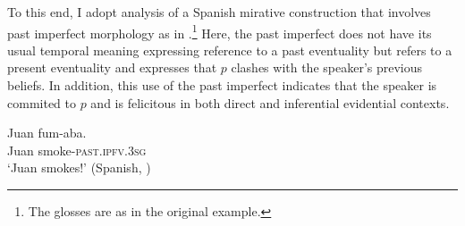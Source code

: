 \documentclass[output=paper,
colorlinks,
citecolor=brown,
newtxmath
]{langscibook}
\begin{document}
%
%
%

To this end, I adopt  analysis of a Spanish mirative construction that involves past imperfect morphology as in .\footnote{The glosses are as in the original example.} Here, the past imperfect does not have its usual temporal meaning expressing reference to a past eventuality but refers to a present eventuality and expresses that $p$ clashes with the speaker's previous beliefs. In addition, this use of the past imperfect indicates that the speaker is commited to $p$ and is felicitous in both direct and inferential evidential contexts.


\ea\label{ex:fumaba}
\gll Juan fum-aba. \hfill \\
Juan smoke-\textsc{past.ipfv.3sg}\\
\glt `Juan smokes!' \hfill (Spanish, \citealt[34]{Bustamante2013})\\
\z

%
%
\end{document}
